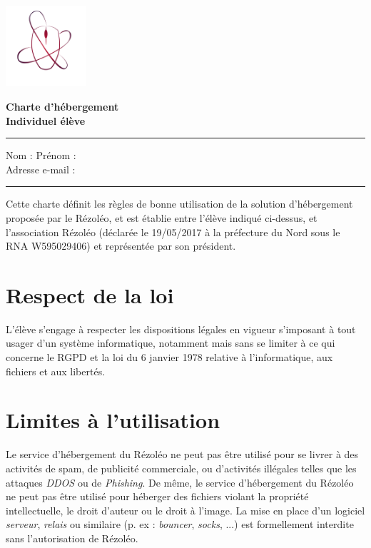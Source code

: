 \documentclass[12pt, a4paper]{article}
\begin{document}
\begin{center}
	\begin{minipage}{0.2\textwidth}
		\includegraphics[height=3cm]{rezoleo_logo.png}
	\end{minipage}
	\begin{minipage}{0.7\textwidth}
		\vspace{0.3cm}
		\Huge \textbf{Charte d'hébergement}\\
		\Huge \textbf{Individuel élève}
	\end{minipage}
\end{center}

\vspace*{0.5cm}

\hrule
\vspace{.5cm}
\noindent Nom : \makebox[8cm]{\dotfill}
\vspace{.5cm}
Prénom : \dotfill\\
Adresse e-mail : \dotfill\\
\hrule
\vspace{1cm}

\noindent Cette charte définit les règles de bonne utilisation de la solution d'hébergement proposée par le Rézoléo, et est établie entre l'élève indiqué ci-dessus, et l'association Rézoléo (déclarée le 19/05/2017 à la préfecture du Nord sous le RNA W595029406) et représentée par son président.

\section{Respect de la loi}

L'élève s'engage à respecter les dispositions légales en vigueur s'imposant à tout usager d'un système informatique, notamment mais sans se limiter à ce qui concerne le RGPD et la loi du 6 janvier 1978 relative à l'informatique, aux fichiers et aux libertés.

\section{Limites à l'utilisation}

Le service d'hébergement du Rézoléo ne peut pas être utilisé pour se livrer à des activités de spam, de publicité commerciale, ou d'activités illégales telles que les attaques \textit{DDOS} ou de \textit{Phishing}. De même, le service d'hébergement du Rézoléo ne peut pas être utilisé pour héberger des fichiers violant la propriété intellectuelle, le droit d'auteur ou le droit à l'image. La mise en place d'un logiciel \textit{serveur}, \textit{relais} ou similaire (p. ex : \textit{bouncer}, \textit{socks}, ...) est formellement interdite sans l'autorisation de Rézoléo.
\end{document}
